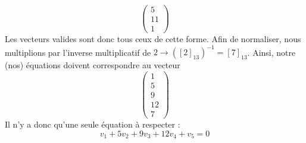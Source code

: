 \documentclass[10p,a4paper]{scrartcl}
\renewcommand{\(}{\left(}
\renewcommand{\)}{\right)}
\begin{document}
\begin{enumerate}
\begin{enumerate}
\[\begin{pmatrix}
				5\\
				11\\
				1
				\end{pmatrix}\]
				Les vecteurs valides sont donc tous ceux de cette forme. Afin de normaliser, nous multiplions par l'inverse multiplicatif de $2 \to ([2]_{13})^{-1} = [7]_{13}$. Ainsi, notre (nos) équations doivent correspondre au vecteur
				\[\begin{pmatrix}
				1\\
				5\\
				9\\
				12\\
				7
				\end{pmatrix}\]
				Il n'y a donc qu'une seule équation à respecter :
				\begin{equation*}
					v_1 + 5v_2 + 9v_3 + 12v_4 + v_5 = 0
				\end{equation*}
			\end{enumerate}
\end{enumerate}
\end{document}
